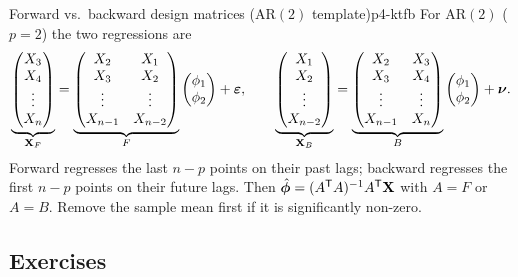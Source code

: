 \begin{keytech}{Forward vs.\ backward design matrices (AR$(2)$ template)}{p4-ktfb}
For AR$(2)$ ($p=2$) the two regressions are
\[
\underbrace{\begin{pmatrix}X_3\\ X_4\\ \vdots\\ X_n\end{pmatrix}}_{\mathbf X_F}
=\underbrace{\begin{pmatrix}X_2 & X_1\\ X_3 & X_2\\ \vdots & \vdots\\ X_{n-1}&X_{n-2}\end{pmatrix}}_{F}
\begin{pmatrix}\phi_1\\ \phi_2\end{pmatrix}+\boldsymbol{\varepsilon},
\qquad
\underbrace{\begin{pmatrix}X_1\\ X_2\\ \vdots\\ X_{n-2}\end{pmatrix}}_{\mathbf X_B}
=\underbrace{\begin{pmatrix}X_2 & X_3\\ X_3 & X_4\\ \vdots & \vdots\\ X_{n-1}&X_n\end{pmatrix}}_{B}
\begin{pmatrix}\phi_1\\ \phi_2\end{pmatrix}+\boldsymbol\nu.
\]
Forward regresses the last $n-p$ points on their past lags; backward regresses
the first $n-p$ points on their future lags. Then
$\hat{\boldsymbol\phi}=(A^{\mathsf{T}} A)^{-1}A^{\mathsf{T}}\mathbf X$ with $A=F$ or $A=B$. Remove
the sample mean first if it is significantly non-zero.
\end{keytech}

\subsection{Exercises}

